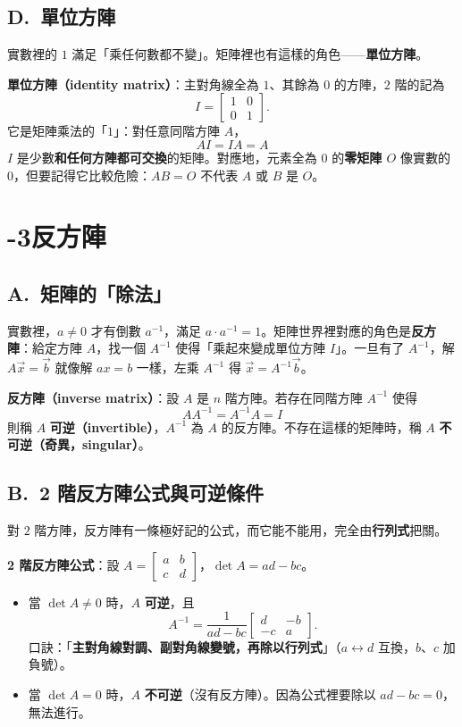 \documentclass[11pt]{article}
\begin{document}
\subsection*{\sffamily D.\ 單位方陣}

實數裡的 $1$ 滿足「乘任何數都不變」。矩陣裡也有這樣的角色——\textbf{單位方陣}。

\textbf{單位方陣（identity matrix）}：主對角線全為 $1$、其餘為 $0$ 的方陣，$2$ 階的記為
$$I=\begin{bmatrix} 1 & 0\\ 0 & 1 \end{bmatrix}.$$
它是矩陣乘法的「$1$」：對任意同階方陣 $A$，
$$\boxed{\;AI=IA=A\;}$$
$I$ 是少數\textbf{和任何方陣都可交換}的矩陣。對應地，元素全為 $0$ 的\textbf{零矩陣 $O$} 像實數的 $0$，但要記得它比較危險：$AB=O$ 不代表 $A$ 或 $B$ 是 $O$。

\section*{-3\quad 反方陣}

\subsection*{\sffamily A.\ 矩陣的「除法」}

實數裡，$a\ne0$ 才有倒數 $a^{-1}$，滿足 $a\cdot a^{-1}=1$。矩陣世界裡對應的角色是\textbf{反方陣}：給定方陣 $A$，找一個 $A^{-1}$ 使得「乘起來變成單位方陣 $I$」。一旦有了 $A^{-1}$，解 $A\vec x=\vec b$ 就像解 $ax=b$ 一樣，左乘 $A^{-1}$ 得 $\vec x=A^{-1}\vec b$。

\textbf{反方陣（inverse matrix）}：設 $A$ 是 $n$ 階方陣。若存在同階方陣 $A^{-1}$ 使得
$$\boxed{\;AA^{-1}=A^{-1}A=I\;}$$
則稱 $A$ \textbf{可逆（invertible）}，$A^{-1}$ 為 $A$ 的反方陣。不存在這樣的矩陣時，稱 $A$ \textbf{不可逆（奇異，singular）}。

\subsection*{\sffamily B.\ 2 階反方陣公式與可逆條件}

對 $2$ 階方陣，反方陣有一條極好記的公式，而它能不能用，完全由\textbf{行列式}把關。

\textbf{2 階反方陣公式}：設 $A=\begin{bmatrix} a & b\\ c & d \end{bmatrix}$，$\det A=ad-bc$。

\begin{itemize}\setlength{\itemsep}{2pt}
\item 當 $\boxed{\det A\ne0}$ 時，$A$ \textbf{可逆}，且
$$A^{-1}=\frac{1}{ad-bc}\begin{bmatrix} d & -b\\ -c & a \end{bmatrix}.$$
口訣：「\textbf{主對角線對調、副對角線變號，再除以行列式}」（$a\leftrightarrow d$ 互換，$b$、$c$ 加負號）。
\item 當 $\boxed{\det A=0}$ 時，$A$ \textbf{不可逆}（沒有反方陣）。因為公式裡要除以 $ad-bc=0$，無法進行。
\end{itemize}
\end{document}

